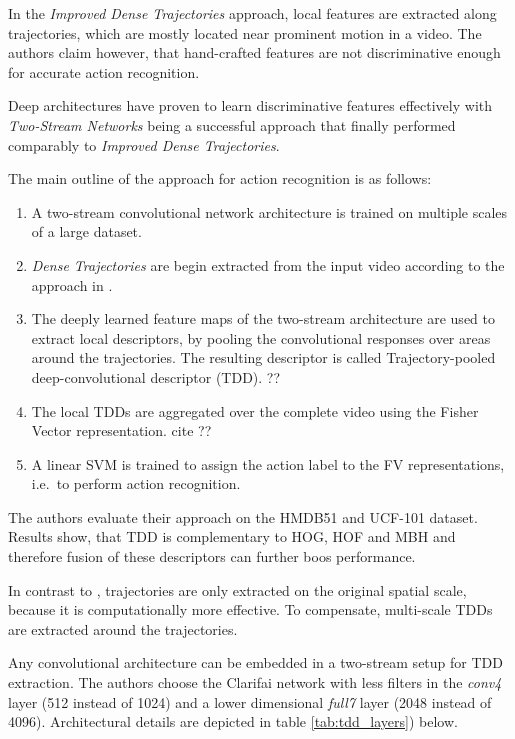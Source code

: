 In the \textit{Improved Dense Trajectories} approach, local features are extracted along trajectories, which are mostly located near prominent motion in a video.
The authors claim however, that hand-crafted features are not discriminative enough for accurate action recognition.

Deep architectures have proven to learn discriminative features effectively with \textit{Two-Stream Networks} being a successful approach that finally performed comparably to \textit{Improved Dense Trajectories}.

The main outline of the approach for action recognition is as follows:
\begin{enumerate}
    \item A two-stream convolutional network architecture is trained on multiple scales of a large dataset.
    \item \textit{Dense Trajectories} are begin extracted from the input video according to the approach in \cite{wang_action_2013}.  
    \item The deeply learned feature maps of the two-stream architecture are used to extract local descriptors, by pooling the convolutional responses over areas around the trajectories. The resulting descriptor is called Trajectory-pooled deep-convolutional descriptor (TDD). ??
    \item The local TDDs are aggregated over the complete video using the Fisher Vector representation. cite ??
    \item A linear SVM is trained to assign the action label to the FV representations, i.e.\ to perform action recognition.
\end{enumerate}

The authors evaluate their approach on the HMDB51 and UCF-101 dataset. Results show, that TDD is complementary to HOG, HOF and MBH and therefore fusion of these descriptors can further boos performance.

In contrast to \cite{wang_action_2013}, trajectories are only extracted on the original spatial scale, because it is computationally more effective.
To compensate, multi-scale TDDs are extracted around the trajectories.

Any convolutional architecture can be embedded in a two-stream setup for TDD extraction.
The authors choose the Clarifai network \cite{zeiler_visualizing_2014-1} with less filters in the \textit{conv4} layer (512 instead of 1024) and a lower dimensional \textit{full7} layer (2048 instead of 4096).
Architectural details are depicted in table \ref{tab:tdd_layers}) below.

